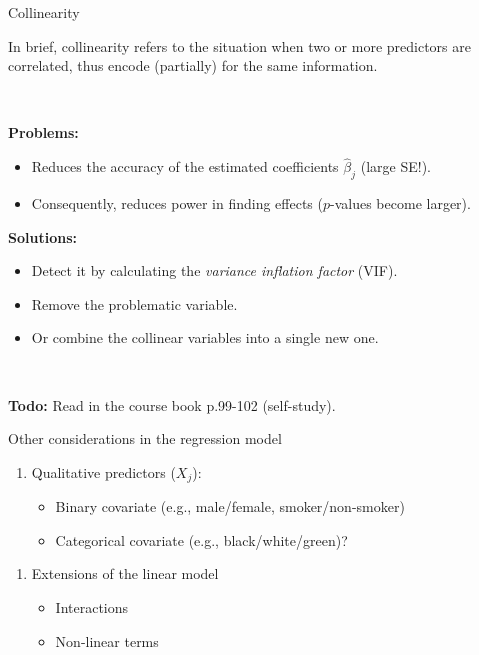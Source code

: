 \documentclass[10pt,ignorenonframetext,]{beamer}
\providecommand{\tightlist}{%
  \setlength{\itemsep}{0pt}\setlength{\parskip}{0pt}}
\begin{document}
\begin{frame}

\begin{block}{Collinearity}

In brief, collinearity refers to the situation when two or more
predictors are correlated, thus encode (partially) for the same
information.

\(~\)

\textbf{Problems:}

\begin{itemize}
\item
  Reduces the accuracy of the estimated coefficients \(\hat\beta_j\)
  (large SE!).
\item
  Consequently, reduces power in finding effects (\(p\)-values become
  larger).
\end{itemize}

\textbf{Solutions:}

\begin{itemize}
\item
  Detect it by calculating the \emph{variance inflation factor} (VIF).
\item
  Remove the problematic variable.
\item
  Or combine the collinear variables into a single new one.
\end{itemize}

\(~\)

\textbf{Todo:} Read in the course book p.99-102 (self-study).

\end{block}

\end{frame}

\begin{frame}{Other considerations in the regression model}

\begin{enumerate}
\def\labelenumi{\arabic{enumi}.}
\tightlist
\item
  Qualitative predictors (\(X_j\)):

  \begin{itemize}
  \tightlist
  \item
    Binary covariate (e.g., male/female, smoker/non-smoker)
  \item
    Categorical covariate (e.g., black/white/green)?
  \end{itemize}
\end{enumerate}

\vspace{4mm}

\begin{enumerate}
\def\labelenumi{\arabic{enumi}.}
\setcounter{enumi}{1}
\tightlist
\item
  Extensions of the linear model

  \begin{itemize}
  \tightlist
  \item
    Interactions
  \item
    Non-linear terms
  \end{itemize}
\end{enumerate}

\end{frame}
\end{document}
